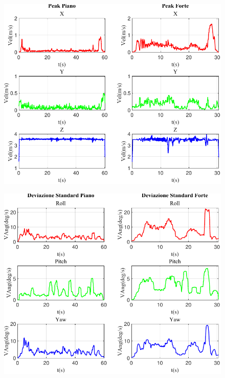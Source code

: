 \documentclass[class=article]{standalone}
\begin{document}
	\begin{center}
		\begin{figure}[h]
			\centering\includegraphics[width=.9\textwidth]{img/lungaFP/Vel/Peak}
			\caption[]{}
			\label{fig:VelPeak_lungaFP}
		\end{figure}
	\end{center}
	
	\begin{center}
		\begin{figure}[h]
			\centering\includegraphics[width=.9\textwidth]{img/lungaFP/VAng/Deviazione Standard}
			\caption[]{}
			\label{fig:VAngStd_lungaFP}
		\end{figure}
	\end{center}
	
\end{document}

